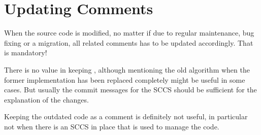 \chapter{Updating Comments}
When the source code is modified, no matter if due to regular maintenance, bug fixing or a migration, all related comments has to be updated accordingly. That is mandatory!

There is no value in keeping , although mentioning the old algorithm when the former implementation has been replaced completely might be useful in some cases. But usually the commit messages for the SCCS should be sufficient for the explanation of the changes.

Keeping the outdated code as a comment is definitely not useful, in particular not when there is an SCCS in place that is used to manage the code.


